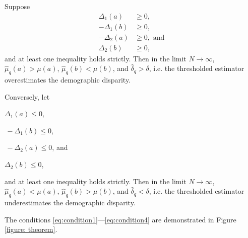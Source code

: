 \begin{corollary} \label{corollary: demographic-est-race}
Suppose
\begin{subequations}
\begin{align}
  \Delta_1(a) &\ge 0,\tag{5i}\label{eq:condition1} \\
  -\Delta_1(b) &\ge 0,\tag{5ii}\label{eq:condition2} \\
 -\Delta_2(a) &\ge 0,\tag{5iii}\textrm{ and} \label{eq:condition3}\\
  \Delta_2(b) &\ge 0,\tag{5iv}\label{eq:condition4}
\end{align}
\end{subequations}
and at least one inequality holds strictly.
Then in the limit $N\!\rightarrow\!\infty$,
$\hat{\mu}_q(a) > \mu(a)$, $\hat{\mu}_q(b) < \mu(b)$, and $\hat{\delta}_q > \delta$, i.e. the thresholded estimator overestimates the demographic disparity.

Conversely, let \begin{enumerate*}[label=(\roman*\ensuremath{^\prime})]
\item $\Delta_1(a)\!\le\!0$,
\item $\,-\Delta_1(b)\!\le\!0$,
\item $\,-\Delta_2(a)\!\le\!0$, and
\item $\Delta_2(b)\!\le\!0$,
\end{enumerate*}
and at least one inequality holds strictly.
Then in the limit $N\rightarrow\infty$,
$\hat{\mu}_q(a) < \mu(a)$, $\hat{\mu}_q(b) > \mu(b)$, and $\hat{\delta}_q < \delta$, i.e. the thresholded estimator underestimates the demographic disparity.
\end{corollary}

The conditions \eqref{eq:condition1}---\eqref{eq:condition4} are demonstrated in Figure \ref{figure: theorem}.

